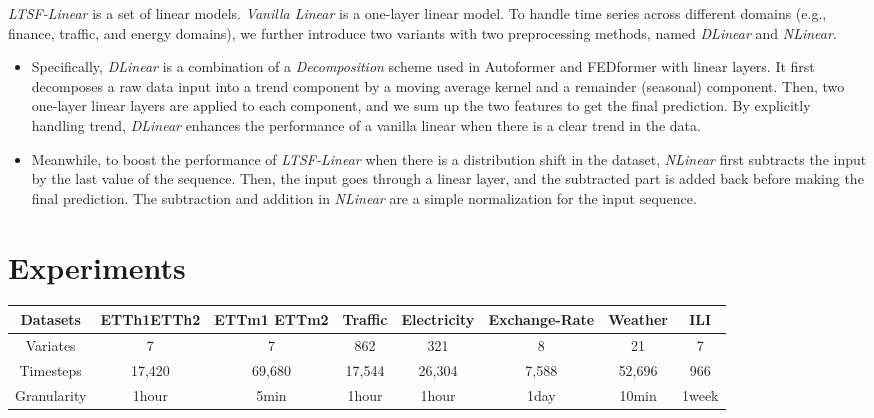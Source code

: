 \documentclass[10pt,twocolumn,letterpaper]{article}
\newcommand{\modelname}{\emph{LTSF-Linear}\xspace}
\begin{document}
\modelname is a set of linear models. \textit{Vanilla Linear} is a one-layer linear model. To handle time series across different domains (e.g., finance, traffic, and energy domains), we further introduce two variants with two preprocessing methods, named \emph{DLinear} and \emph{NLinear}. 

\begin{itemize}

\item Specifically, \emph{DLinear} is a combination of a \emph{Decomposition} scheme used in Autoformer and FEDformer with linear layers. It first decomposes a raw data input into a trend component by a moving average kernel and a remainder (seasonal) component. Then, two one-layer linear layers are applied to each component, and we sum up the two features to get the final prediction.
By explicitly handling trend, \emph{DLinear} enhances the performance of a vanilla linear when there is a clear trend in the data. 
\item Meanwhile, to boost the performance of \modelname when there is a distribution shift in the dataset, \emph{NLinear} first subtracts the input by the last value of the sequence. Then, the input goes through a linear layer, and the subtracted part is added back before making the final prediction. The subtraction and addition in \emph{NLinear} are a simple normalization for the input sequence.
\end{itemize}
 

\section{Experiments}
\label{sec:exp}


\begin{table*}[h]
\vspace{-0.4cm}
\begin{center}
\scalebox{0.8}
{
\begin{tabular}{c|ccccccc} \hline
Datasets       & ETTh1ETTh2       & ETTm1 ETTm2        & Traffic     & Electricity  & Exchange-Rate & Weather      & ILI      \\ \hline
Variates       & 7          & 7            & 862         & 321          & 8             & 21          & 7      \\
Timesteps      & 17,420     & 69,680       & 17,544      & 26,304       & 7,588         & 52,696       & 966     \\
Granularity    & 1hour      & 5min         & 1hour       & 1hour        & 1day          & 10min        & 1week    \\ \hline
\end{tabular}}
\end{center}
\vspace{-0.5cm}
\caption{The statistics of the nine popular datasets for the LTSF problem.}
\label{tab:datasets}
\vspace{-0.2cm}
\end{table*}
\end{document}
